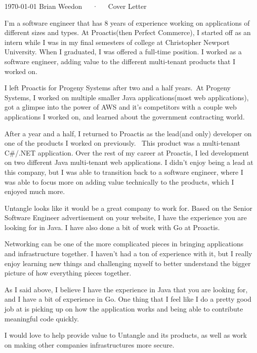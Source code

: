 \documentclass[11pt, a4paper]{awesome-cv}
\begin{document}
\makecvheader[C]

\makecvfooter
{\today}
{Brian Weedon~~~·~~~Cover Letter}
{}

\makelettertitle

\begin{cvletter}

    I'm a software engineer that has 8 years of experience working on applications of different sizes and types. At Proactis(then Perfect Commerce), I started off as an intern while I was in my final semesters of college at Christopher Newport University. When I graduated, I was offered a full-time position. I worked as a software engineer, adding value to the different multi-tenant products that I worked on. 

    I left Proactis for Progeny Systems after two and a half years. At Progeny Systems, I worked on multiple smaller Java applications(most web applications), got a glimpse into the power of AWS and it's competitors with a couple web applications I worked on, and learned about the government contracting world. 

    After a year and a half, I returned to Proactis as the lead(and only) developer on one of the products I worked on previously.  This product was a multi-tenant C\#/.NET application. Over the rest of my career at Proactis, I led development on two different Java multi-tenant web applications. I didn't enjoy being a lead at this company, but I was able to transition back to a software engineer, where I was able to focus more on adding value technically to the products, which I enjoyed much more.

    Untangle looks like it would be a great company to work for. Based on the Senior Software Engineer advertisement on your website, I have the experience you are looking for in Java. I have also done a bit of work with Go at Proactis. 

    Networking can be one of the more complicated pieces in bringing applications and infrastructure together. I haven't had a ton of experience with it, but I really enjoy learning new things and challenging myself to better understand the bigger picture of how everything pieces together.


    As I said above, I believe I have the experience in Java that you are looking for, and I have a bit of experience in Go. One thing that I feel like I do a pretty good job at is picking up on how the application works and being able to contribute meaningful code quickly.

    I would love to help provide value to Untangle and its products, as well as work on making other companies infrastructures more secure.
\end{cvletter}


\makeletterclosing
\end{document}
